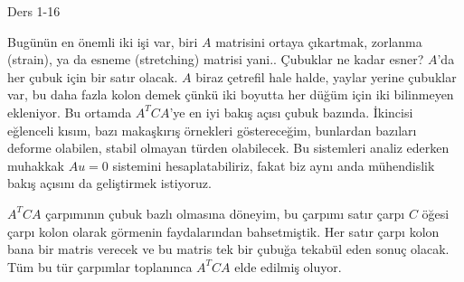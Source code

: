 \documentclass[12pt,fleqn]{article}\usepackage{../../common}
\begin{document}
Ders 1-16

Bugünün en önemli iki işi var, biri $A$ matrisini ortaya çıkartmak, zorlanma
(strain), ya da esneme (stretching) matrisi yani.. Çubuklar ne kadar esner?
$A$'da her çubuk için bir satır olacak. $A$ biraz çetrefil hale halde, yaylar
yerine çubuklar var, bu daha fazla kolon demek çünkü iki boyutta her düğüm için
iki bilinmeyen ekleniyor. Bu ortamda $A^T C A$'ye en iyi bakış açısı çubuk
bazında. İkincisi eğlenceli kısım, bazı makaşkırış örnekleri göstereceğim,
bunlardan bazıları deforme olabilen, stabil olmayan türden olabilecek.
Bu sistemleri analiz ederken muhakkak $Au = 0$ sistemini hesaplatabiliriz,
fakat biz aynı anda  mühendislik bakış açısını da geliştirmek istiyoruz.

$A^T C A$ çarpımının çubuk bazlı olmasına döneyim, bu çarpımı satır çarpı $C$
öğesi çarpı kolon olarak görmenin faydalarından bahsetmiştik. Her satır çarpı
kolon bana bir matris verecek ve bu matris tek bir çubuğa tekabül eden sonuç
olacak. Tüm bu tür çarpımlar toplanınca $A^T C A$ elde edilmiş oluyor. 
\end{document}
